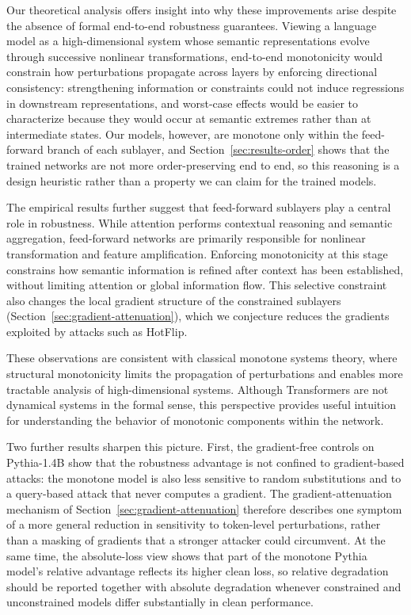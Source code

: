 \documentclass{article}
\theoremstyle{plain}
\theoremstyle{definition}
\theoremstyle{remark}
\theoremstyle{plain}
\begin{document}
Our theoretical analysis offers insight into why these improvements arise despite the absence of formal end-to-end robustness guarantees. Viewing a language model as a high-dimensional system whose semantic representations evolve through successive nonlinear transformations, end-to-end monotonicity would constrain how perturbations propagate across layers by enforcing directional consistency: strengthening information or constraints could not induce regressions in downstream representations, and worst-case effects would be easier to characterize because they would occur at semantic extremes rather than at intermediate states. Our models, however, are monotone only within the feed-forward branch of each sublayer, and Section~\ref{sec:results-order} shows that the trained networks are not more order-preserving end to end, so this reasoning is a design heuristic rather than a property we can claim for the trained models.

The empirical results further suggest that feed-forward sublayers play a central role in robustness. While attention performs contextual reasoning and semantic aggregation, feed-forward networks are primarily responsible for nonlinear transformation and feature amplification. Enforcing monotonicity at this stage constrains how semantic information is refined after context has been established, without limiting attention or global information flow. This selective constraint also changes the local gradient structure of the constrained sublayers (Section~\ref{sec:gradient-attenuation}), which we conjecture reduces the gradients exploited by attacks such as HotFlip.

These observations are consistent with classical monotone systems theory, where structural monotonicity limits the propagation of perturbations and enables more tractable analysis of high-dimensional systems. Although Transformers are not dynamical systems in the formal sense, this perspective provides useful intuition for understanding the behavior of monotonic components within the network.

Two further results sharpen this picture. First, the gradient-free controls on Pythia-1.4B show that the robustness advantage is not confined to gradient-based attacks: the monotone model is also less sensitive to random substitutions and to a query-based attack that never computes a gradient. The gradient-attenuation mechanism of Section~\ref{sec:gradient-attenuation} therefore describes one symptom of a more general reduction in sensitivity to token-level perturbations, rather than a masking of gradients that a stronger attacker could circumvent. At the same time, the absolute-loss view shows that part of the monotone Pythia model's relative advantage reflects its higher clean loss, so relative degradation should be reported together with absolute degradation whenever constrained and unconstrained models differ substantially in clean performance.
\end{document}

